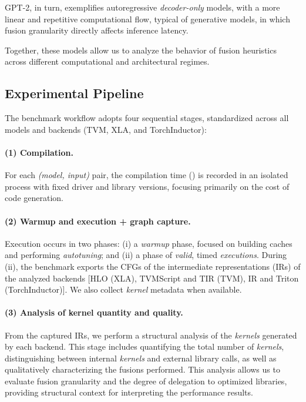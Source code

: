 \documentclass[sigconf,anonymous]{acmart}
\newcommand{\tcode}[1]{\texttt{\seqsplit{#1}}}
\begin{document}
GPT-2, in turn, exemplifies autoregressive \textit{decoder-only} models, with a more linear and repetitive computational flow, typical of generative models, in which fusion granularity directly affects inference latency.

Together, these models allow us to analyze the behavior of fusion heuristics across different computational and architectural regimes.

\subsection{Experimental Pipeline}
\label{sec:pipeline}
The benchmark workflow adopts four sequential stages, standardized across all models and backends (TVM, XLA, and TorchInductor):

\paragraph{(1) Compilation.}
For each \textit{(model, input)} pair, the compilation time (\tcode{compile\_ms}) is recorded in an isolated process with fixed driver and library versions, focusing primarily on the cost of code generation.

\paragraph{(2) Warmup and execution + graph capture.}
Execution occurs in two phases: (i) a \textit{warmup} phase, focused on building caches and performing \textit{autotuning}; and (ii) a phase of \textit{valid}, timed \textit{executions}. During (ii), the benchmark exports the CFGs of the intermediate representations (IRs) of the analyzed backends [HLO (XLA), TVMScript and TIR (TVM), IR and Triton (TorchInductor)]. We also collect \textit{kernel} metadata when available.

\paragraph{(3) Analysis of kernel quantity and quality.}
From the captured IRs, we perform a structural analysis of the \textit{kernels} generated by each backend. This stage includes quantifying the total number of \textit{kernels}, distinguishing between internal \textit{kernels} and external library calls, as well as qualitatively characterizing the fusions performed. This analysis allows us to evaluate fusion granularity and the degree of delegation to optimized libraries, providing structural context for interpreting the performance results.
\end{document}
